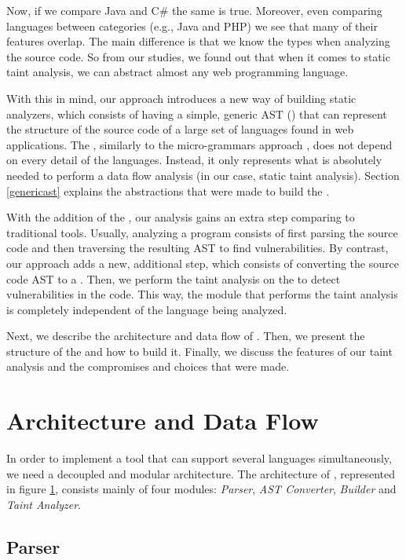 Now, if we compare Java and C\# the same is true. Moreover, even comparing languages between categories (e.g., Java and PHP) we see that many of their features overlap. The main difference is that we know the types when analyzing the source code. So from our studies, we found out that when it comes to static taint analysis, we can abstract almost any web programming language. 

With this in mind, our approach introduces a new way of building static analyzers, which consists of having a simple, generic AST (\astname{}) that can represent the structure of the source code of a large set of languages found in web applications. The \astname{}, similarly to the micro-grammars approach \cite{microgrammars}, does not depend on every detail of the languages. Instead, it only represents what is absolutely needed to perform a data flow analysis (in our case, static taint analysis). Section \ref{genericast} explains the abstractions that were made to build the \astname{}.

With the addition of the \astname{}, our analysis gains an extra step comparing to traditional tools. Usually, analyzing a program consists of first parsing the source code and then traversing the resulting AST to find vulnerabilities. By contrast, our approach adds a new, additional step, which consists of converting the source code AST to a \astname{}. Then, we perform the taint analysis on the \astname{} to detect vulnerabilities in the code. This way, the module that performs the taint analysis is completely independent of the language being analyzed. 

Next, we describe the architecture and data flow of \toolname{}. Then, we present the  structure of the \astname{} and how to build it. Finally, we discuss the features of our taint analysis and the compromises and choices that were made.


\section{Architecture and Data Flow}
\label{architecture}


In order to implement a tool that can support several languages simultaneously, we need a decoupled and modular architecture. The architecture of \toolname{}, represented in figure \ref{architecture}, consists mainly of four modules: \textit{Parser}, \textit{AST Converter}, \textit{\astname{} Builder} and \textit{Taint Analyzer}.

\subsection{Parser} 

